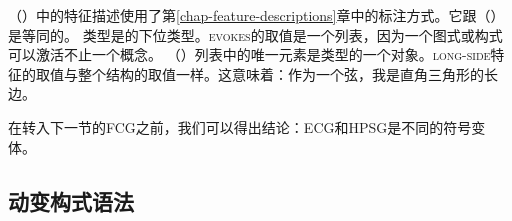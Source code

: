 （）中的特征描述使用了第\ref{chap-feature-descriptions}章中的标注方式。它跟（）是等同的。
\ea
{} 
\z
类型是的下位类型。\textsc{evokes}的取值是一个列表，因为一个图式或构式可以激活不止一个概念。 （）列表中的唯一元素是类型的一个对象。\textsc{long-side}特征的取值与整个结构的取值一样。这意味着：作为一个弦，我是直角三角形的长边。

在转入下一节的FCG之前，我们可以得出结论：ECG和HPSG是不同的符号变体。

\subsection{动变构式语法}
\label{sec-fcg}


